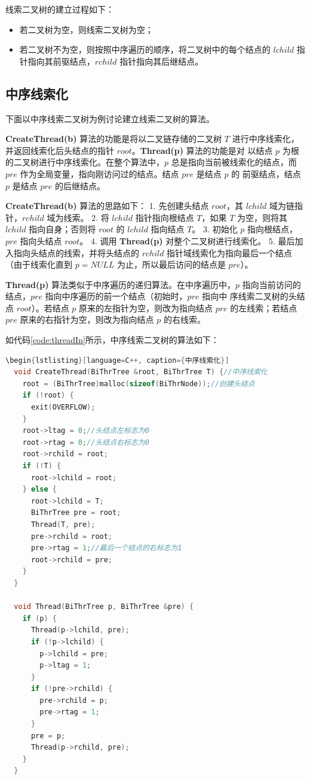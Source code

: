 \documentclass[lang=cn,newtx,10pt,scheme=chinese]{../elegantbook}
\begin{document}
线索二叉树的建立过程如下：

\begin{itemize}
  \item 若二叉树为空，则线索二叉树为空；
  \item 若二叉树不为空，则按照中序遍历的顺序，将二叉树中的每个结点的 $lchild$ 指针指向其前驱结点，$rchild$ 指针指向其后继结点。
  \end{itemize}

\subsection{中序线索化}

下面以中序线索二叉树为例讨论建立线索二叉树的算法。

\textbf{CreateThread(b)} 算法的功能是将以二叉链存储的二叉树 $T$ 进行中序线索化，并返回线索化后头结点的指针 $root$。\textbf{Thread(p)} 算法的功能是对
以结点 $p$ 为根的二叉树进行中序线索化。在整个算法中，$p$ 总是指向当前被线索化的结点，而 $pre$ 作为全局变量，指向刚访问过的结点。结点 $pre$ 是结点 $p$ 的
前驱结点，结点 $p$ 是结点 $pre$ 的后继结点。

\textbf{CreateThread(b)} 算法的思路如下：
1. 先创建头结点 $root$，其 $lchild$ 域为链指针，$rchild$ 域为线索。
2. 将 $lchild$ 指针指向根结点 $T$，如果 $T$ 为空，则将其 $lchild$ 指向自身；否则将 $root$ 的 $lchild$ 指向结点 $T$。
3. 初始化 $p$ 指向根结点，$pre$ 指向头结点 $root$。
4. 调用 \textbf{Thread(p)} 对整个二叉树进行线索化。
5. 最后加入指向头结点的线索，并将头结点的 $rchild$ 指针域线索化为指向最后一个结点（由于线索化直到 $p = NULL$ 为止，所以最后访问的结点是 $pre$）。

\textbf{Thread(p)} 算法类似于中序遍历的递归算法。在中序遍历中，$p$ 指向当前访问的结点，$pre$ 指向中序遍历的前一个结点（初始时，$pre$ 指向中
序线索二叉树的头结点 $root$）。若结点 $p$ 原来的左指针为空，则改为指向结点 $pre$ 的左线索；若结点 $pre$ 原来的右指针为空，则改为指向结点 $p$ 的右线索。

如代码\ref{code:threadIn}所示，中序线索二叉树的算法如下：

\begin{lstlisting}[language=C++, caption={中序线索化}, label={code:threadIn}]
  \begin{lstlisting}[language=C++, caption={中序线索化}]
  void CreateThread(BiThrTree &root, BiThrTree T) {//中序线索化
    root = (BiThrTree)malloc(sizeof(BiThrNode));//创建头结点
    if (!root) {
      exit(OVERFLOW);
    }
    root->ltag = 0;//头结点左标志为0
    root->rtag = 0;//头结点右标志为0
    root->rchild = root;
    if (!T) {
      root->lchild = root;
    } else {
      root->lchild = T;
      BiThrTree pre = root;
      Thread(T, pre);
      pre->rchild = root;
      pre->rtag = 1;//最后一个结点的右标志为1
      root->rchild = pre;
    }
  }
  
  void Thread(BiThrTree p, BiThrTree &pre) {
    if (p) {
      Thread(p->lchild, pre);
      if (!p->lchild) {
        p->lchild = pre;
        p->ltag = 1;
      }
      if (!pre->rchild) {
        pre->rchild = p;
        pre->rtag = 1;
      }
      pre = p;
      Thread(p->rchild, pre);
    }
  }
  \end{lstlisting}
\end{document}
